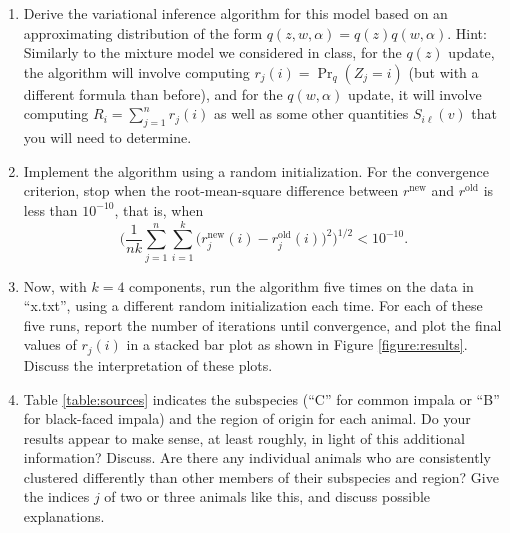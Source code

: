 \documentclass[12pt]{article}
\begin{document}
\begin{enumerate}
\item Derive the variational inference algorithm for this model based on an approximating distribution of the form $q(z,w,\alpha) = q(z) q(w,\alpha)$. Hint: Similarly to the mixture model we considered in class, for the $q(z)$ update, the algorithm will involve computing $r_j(i) = \Pr_q(Z_j = i)$ (but with a different formula than before), and for the $q(w,\alpha)$ update, it will involve computing $R_i = \sum_{j = 1}^n r_j(i)$ as well as some other quantities $S_{i \ell}(v)$ that you will need to determine.

\item Implement the algorithm using a random initialization. For the convergence criterion, stop when the root-mean-square difference between $r^\text{new}$ and $r^\text{old}$ is less than $10^{-10}$, that is, when
$$\Big(\frac{1}{n k}\sum_{j = 1}^n \sum_{i = 1}^k \big(r_j^\text{new}(i) - r_j^\text{old}(i)\big)^2 \Big)^{1/2} < 10^{-10}. $$

\item Now, with $k = 4$ components, run the algorithm five times on the data in ``x.txt'', using a different random initialization each time. For each of these five runs, report the number of iterations until convergence, and plot the final values of $r_j(i)$ in a stacked bar plot as shown in Figure \ref{figure:results}. Discuss the interpretation of these plots.

\item Table \ref{table:sources} indicates the subspecies (``C'' for common impala or ``B'' for black-faced impala) and the region of origin for each animal. Do your results appear to make sense, at least roughly, in light of this additional information? Discuss. Are there any individual animals who are consistently clustered differently than other members of their subspecies and region? Give the indices $j$ of two or three animals like this, and discuss possible explanations.
\end{enumerate}
\end{document}
